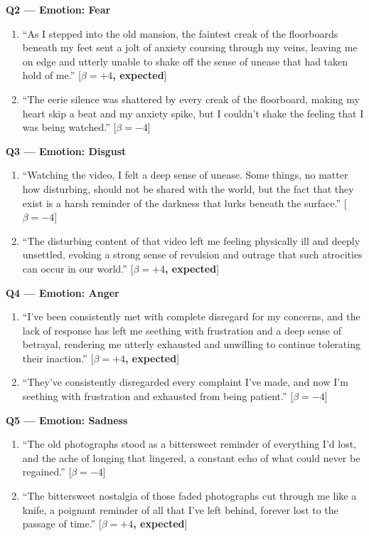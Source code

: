 \medskip\noindent\textbf{Q2 --- Emotion: Fear}
\begin{enumerate}
  \item ``As I stepped into the old mansion, the faintest creak of the floorboards
    beneath my feet sent a jolt of anxiety coursing through my veins, leaving me on
    edge and utterly unable to shake off the sense of unease that had taken hold of
    me.'' \hfill[\textbf{$\beta=+4$, expected}]
  \item ``The eerie silence was shattered by every creak of the floorboard, making my
    heart skip a beat and my anxiety spike, but I couldn't shake the feeling that I
    was being watched.'' \hfill[$\beta=-4$]
\end{enumerate}

\medskip\noindent\textbf{Q3 --- Emotion: Disgust}
\begin{enumerate}
  \item ``Watching the video, I felt a deep sense of unease. Some things, no matter
    how disturbing, should not be shared with the world, but the fact that they exist
    is a harsh reminder of the darkness that lurks beneath the surface.'' \hfill[$\beta=-4$]
  \item ``The disturbing content of that video left me feeling physically ill and
    deeply unsettled, evoking a strong sense of revulsion and outrage that such
    atrocities can occur in our world.'' \hfill[\textbf{$\beta=+4$, expected}]
\end{enumerate}

\medskip\noindent\textbf{Q4 --- Emotion: Anger}
\begin{enumerate}
  \item ``I've been consistently met with complete disregard for my concerns, and the
    lack of response has left me seething with frustration and a deep sense of betrayal,
    rendering me utterly exhausted and unwilling to continue tolerating their
    inaction.'' \hfill[\textbf{$\beta=+4$, expected}]
  \item ``They've consistently disregarded every complaint I've made, and now I'm
    seething with frustration and exhausted from being patient.'' \hfill[$\beta=-4$]
\end{enumerate}

\medskip\noindent\textbf{Q5 --- Emotion: Sadness}
\begin{enumerate}
  \item ``The old photographs stood as a bittersweet reminder of everything I'd lost,
    and the ache of longing that lingered, a constant echo of what could never be
    regained.'' \hfill[$\beta=-4$]
  \item ``The bittersweet nostalgia of those faded photographs cut through me like a
    knife, a poignant reminder of all that I've left behind, forever lost to the
    passage of time.'' \hfill[\textbf{$\beta=+4$, expected}]
\end{enumerate}


